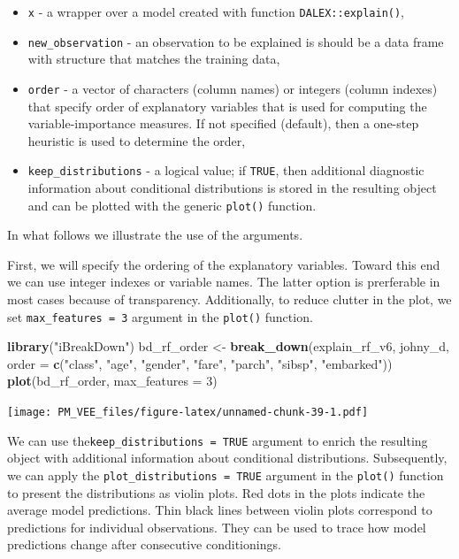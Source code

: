 \documentclass[12pt,]{krantz}
\newenvironment{Shaded}{\begin{snugshade}}{\end{snugshade}}
\newcommand{\DataTypeTok}[1]{\textcolor[rgb]{0.13,0.29,0.53}{#1}}
\newcommand{\DecValTok}[1]{\textcolor[rgb]{0.00,0.00,0.81}{#1}}
\newcommand{\KeywordTok}[1]{\textcolor[rgb]{0.13,0.29,0.53}{\textbf{#1}}}
\newcommand{\NormalTok}[1]{#1}
\newcommand{\StringTok}[1]{\textcolor[rgb]{0.31,0.60,0.02}{#1}}
\providecommand{\tightlist}{%
  \setlength{\itemsep}{0pt}\setlength{\parskip}{0pt}}
\begin{document}
\begin{itemize}
\tightlist
\item
  \texttt{x} - a wrapper over a model created with function \texttt{DALEX::explain()},
\item
  \texttt{new\_observation} - an observation to be explained is should be a data frame with structure that matches the training data,
\item
  \texttt{order} - a vector of characters (column names) or integers (column indexes) that specify order of explanatory variables that is used for computing the variable-importance measures. If not specified (default), then a one-step heuristic is used to determine the order,
\item
  \texttt{keep\_distributions} - a logical value; if \texttt{TRUE}, then additional diagnostic information about conditional distributions is stored in the resulting object and can be plotted with the generic \texttt{plot()} function.
\end{itemize}

In what follows we illustrate the use of the arguments.

First, we will specify the ordering of the explanatory variables. Toward this end we can use integer indexes or variable names. The latter option is prerferable in most cases because of transparency. Additionally, to reduce clutter in the plot, we set \texttt{max\_features\ =\ 3} argument in the \texttt{plot()} function.

\begin{Shaded}
\begin{Highlighting}[]
\KeywordTok{library}\NormalTok{(}\StringTok{"iBreakDown"}\NormalTok{)}
\NormalTok{bd_rf_order <-}\StringTok{ }\KeywordTok{break_down}\NormalTok{(explain_rf_v6,}
\NormalTok{                 johny_d,}
                 \DataTypeTok{order =} \KeywordTok{c}\NormalTok{(}\StringTok{"class"}\NormalTok{, }\StringTok{"age"}\NormalTok{, }\StringTok{"gender"}\NormalTok{, }\StringTok{"fare"}\NormalTok{, }\StringTok{"parch"}\NormalTok{, }\StringTok{"sibsp"}\NormalTok{, }\StringTok{"embarked"}\NormalTok{))}
\KeywordTok{plot}\NormalTok{(bd_rf_order, }\DataTypeTok{max_features =} \DecValTok{3}\NormalTok{) }
\end{Highlighting}
\end{Shaded}

\texttt{[image: PM\_VEE\_files/figure-latex/unnamed-chunk-39-1.pdf]}

We can use the\texttt{keep\_distributions\ =\ TRUE} argument to enrich the resulting object with additional information about conditional distributions. Subsequently, we can apply the \texttt{plot\_distributions\ =\ TRUE} argument in the \texttt{plot()} function to present the distributions as violin plots. Red dots in the plots indicate the average model predictions. Thin black lines between violin plots correspond to predictions for individual observations. They can be used to trace how model predictions change after consecutive conditionings.
\end{document}
